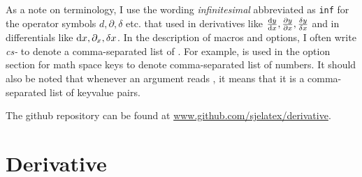	As a note on terminology, I use the wording \emph{infinitesimal} abbreviated as \texttt{inf} for the operator symbols $d, \partial, \delta$ etc. that used in derivatives like $\odv{y}{x}, \pdv{y}{x}, \fdv{y}{x}$ and in differentials like $\odif{x}, \pdif{x}, \fdif{x}$. In the description of macros and options, I often write \emph{cs-} to denote a comma-separated list of . For example,  is used in the option section for math space keys to denote comma-separated list of numbers. It should also be noted that whenever an argument reads , it means that it is a comma-separated list of keyvalue pairs.

	\bigskip

	\noindent The github repository can be found at \href{https://github.com/sjelatex/derivative}{www.github.com/sjelatex/derivative}.



	\clearpage
	\section{Derivative}

